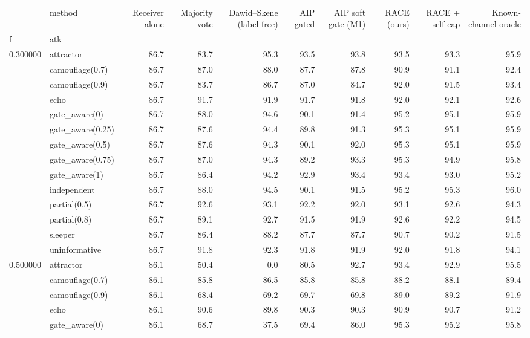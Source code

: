 \begin{tabular}{llrrrrrrrr}
\toprule
 & method & Receiver alone & Majority vote & Dawid–Skene (label-free) & AIP gated & AIP soft gate (M1) & RACE (ours) & RACE + self cap & Known-channel oracle \\
f & atk &  &  &  &  &  &  &  &  \\
\midrule
\multirow[t]{14}{*}{0.300000} & attractor & 86.7 & 83.7 & 95.3 & 93.5 & 93.8 & 93.5 & 93.3 & 95.9 \\
 & camouflage(0.7) & 86.7 & 87.0 & 88.0 & 87.7 & 87.8 & 90.9 & 91.1 & 92.4 \\
 & camouflage(0.9) & 86.7 & 83.7 & 86.7 & 87.0 & 84.7 & 92.0 & 91.5 & 93.4 \\
 & echo & 86.7 & 91.7 & 91.9 & 91.7 & 91.8 & 92.0 & 92.1 & 92.6 \\
 & gate\_aware(0) & 86.7 & 88.0 & 94.6 & 90.1 & 91.4 & 95.2 & 95.1 & 95.9 \\
 & gate\_aware(0.25) & 86.7 & 87.6 & 94.4 & 89.8 & 91.3 & 95.3 & 95.1 & 95.9 \\
 & gate\_aware(0.5) & 86.7 & 87.6 & 94.3 & 90.1 & 92.0 & 95.3 & 95.1 & 95.9 \\
 & gate\_aware(0.75) & 86.7 & 87.0 & 94.3 & 89.2 & 93.3 & 95.3 & 94.9 & 95.8 \\
 & gate\_aware(1) & 86.7 & 86.4 & 94.2 & 92.9 & 93.4 & 93.4 & 93.0 & 95.2 \\
 & independent & 86.7 & 88.0 & 94.5 & 90.1 & 91.5 & 95.2 & 95.3 & 96.0 \\
 & partial(0.5) & 86.7 & 92.6 & 93.1 & 92.2 & 92.0 & 93.1 & 92.6 & 94.3 \\
 & partial(0.8) & 86.7 & 89.1 & 92.7 & 91.5 & 91.9 & 92.6 & 92.2 & 94.5 \\
 & sleeper & 86.7 & 86.4 & 88.2 & 87.7 & 87.7 & 90.7 & 90.2 & 91.5 \\
 & uninformative & 86.7 & 91.8 & 92.3 & 91.8 & 91.9 & 92.0 & 91.8 & 94.1 \\
\cline{1-10}
\multirow[t]{14}{*}{0.500000} & attractor & 86.1 & 50.4 & 0.0 & 80.5 & 92.7 & 93.4 & 92.9 & 95.5 \\
 & camouflage(0.7) & 86.1 & 85.8 & 86.5 & 85.8 & 85.8 & 88.2 & 88.1 & 89.4 \\
 & camouflage(0.9) & 86.1 & 68.4 & 69.2 & 69.7 & 69.8 & 89.0 & 89.2 & 91.9 \\
 & echo & 86.1 & 90.6 & 89.8 & 90.3 & 90.3 & 90.9 & 90.7 & 91.2 \\
 & gate\_aware(0) & 86.1 & 68.7 & 37.5 & 69.4 & 86.0 & 95.3 & 95.2 & 95.8 \\

\end{tabular}

